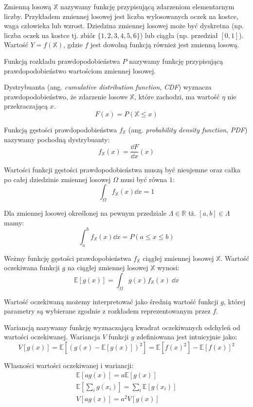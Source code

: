 \documentclass[../main.tex]{subfiles}
\begin{document}
Zmienną losową $\mathbb{X}$ nazywamy funkcję przypisującą zdarzeniom elementarnym liczby. Przykładem zmiennej losowej jest liczba wylosowanych oczek na kostce, waga człowieka lub wzrost. Dziedzina zmiennej losowej może być dyskretna (np. liczba oczek na kostce tj. zbiór $\{1,2,3,4,5,6\}$) lub ciągła (np. przedział $[0,1]$). Wartość $Y = f(\mathbb{X})$, gdzie $f$ jest dowolną funkcją również jest zmienną losową. 

Funkcją rozkładu prawdopodobieństwa $P$ nazywamy funkcję przypisującą prawdopodobieństwo wartościom zmiennej losowej. 

Dystrybuanta (ang. \textit{cumulative distribution function}, \textit{CDF}) wyznacza prawdopodobieństwo, że zdarzenie losowe $\mathbb{X}$, które zachodzi, ma wartość $\eta$ nie przekraczającą $x$.
\[
    F(x) = P(\mathbb{X} \leq x)
\]

Funkcją gęstości prawdopodobieństwa $f_{\mathbb{X}}$ (ang. \textit{probability density function}, \textit{PDF}) nazywamy pochodną dystrybuanty:
\[
    f_{\mathbb{X}}(x) = \frac{\dd F}{\dd x}(x)
\]

Wartości funkcji gęstości prawdopodobieństwa muszą być nieujemne oraz całka po całej dziedzinie zmiennej losowej $\Omega$ musi być równa $1$:
\[
    \int_{\Omega} f_{\mathbb{X}}(x) \dd x = 1
\]

Dla zmiennej losowej określonej na pewnym przedziale $\Lambda \in \mathbb{R}$ tż. $[a,b] \in \Lambda$ mamy:
\[
    \int_{a}^{b} f_{\mathbb{X}}(x) \dd x = P(a \leq x \leq b)
\]

Weżmy funkcję gęstości prawdopobieństwa $f_{\mathbb{X}}$ ciągłej zmiennej losowej $\mathbb{X}$. Wartość oczekiwana funkcji $g$ na ciągłej zmiennej losowej $\mathbb{X}$ wynosi:
\[
\mathbb{E}\left[ g(x) \right] =
\int_{\Omega}{
	g(x) f_{\mathbb{X}}(x)
	\: \dd x
}
\]

Wartość oczekiwaną możemy interpretować jako średnią wartość funkcji $g$, której parametry są wybierane zgodnie z rozkładem reprezentowanym przez $f$.

Wariancją nazywamy funkcję wyznaczającą kwadrat oczekiwanych odchyleń od wartości oczekiwanej. Wariancja $V$ funkcji $g$ zdefiniowana jest intuicyjnie jako:
\[
V\left[ g(x) \right] 
	=
	\mathbb{E}\left[ 
		\left( 
			g(x) - \mathbb{E}\left[ g(x) \right] 
		\right)^2 
	\right]
	=
	\mathbb{E}\left[
		f(x)^2
	\right] - \mathbb{E}\left[
		f(x)
	\right]^2
\]

Własności wartości oczekiwanej i wariancji:
\begin{gather*}
\mathbb{E}\left[ag(x)\right] = a \mathbb{E} \left[g(x)\right] \\
\mathbb{E}\left[\sum_{i} g(x_i)\right] = \sum_{i} \mathbb{E} \left[g(x_i)\right] \\
V\left[ ag(x) \right] = a^2 V\left[g(x)\right]
\end{gather*}
\end{document}
